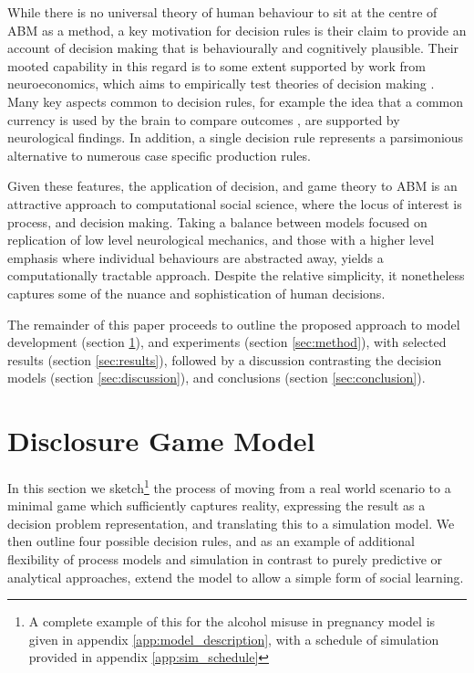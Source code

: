 \documentclass[graybox]{svmult}
\begin{document}
While there is no universal theory of human behaviour to sit at the centre of \ac{ABM} as a method, a key motivation for decision rules is their claim to provide an account of decision making that is behaviourally and cognitively plausible. Their mooted capability in this regard is to some extent supported by work from neuroeconomics, which aims to empirically test theories of decision making \citep{Rustichini2009}. Many key aspects common to decision rules, for example the idea that a common currency is used by the brain to compare outcomes \citep{Padoa-Schioppa2006,Padoa-Schioppa2008}, are supported by neurological findings. In addition, a single decision rule represents a parsimonious alternative to numerous case specific production rules. 

Given these features, the application of decision, and game theory to \ac{ABM} is an attractive approach to computational social science, where the locus of interest is process, and decision making. Taking a balance between models focused on replication of low level neurological mechanics, and those with a higher level emphasis where individual behaviours are abstracted away, yields a computationally tractable approach. Despite the relative simplicity, it nonetheless captures some of the nuance and sophistication of human decisions.


The remainder of this paper proceeds to outline the proposed approach to model development (section \ref{sec:midwives_model}), and experiments (section \ref{sec:method}), with selected results (section \ref{sec:results}), followed by a discussion contrasting the decision models (section \ref{sec:discussion}), and conclusions (section \ref{sec:conclusion}). 
\section{Disclosure Game Model}
\label{sec:midwives_model}

In this section we sketch\footnote{A complete example of this for the alcohol misuse in pregnancy model is given in appendix \ref{app:model_description}, with a schedule of simulation provided in appendix \ref{app:sim_schedule}} the process of moving from a real world scenario to a minimal game which sufficiently captures reality, expressing the result as a decision problem representation, and translating this to a simulation model. We then outline four possible decision rules, and as an example of additional flexibility of process models and simulation in contrast to purely predictive or analytical approaches, extend the model to allow a simple form of social learning.
\end{document}
